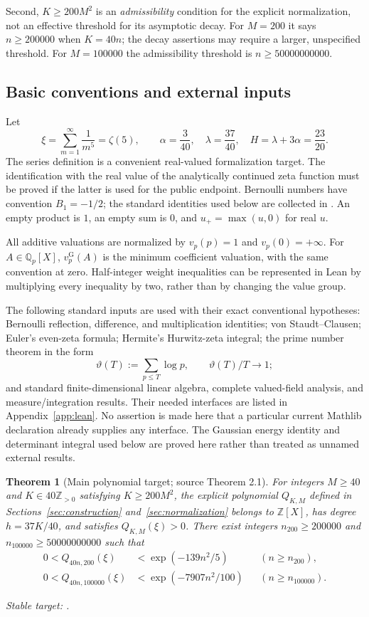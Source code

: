 \documentclass[11pt]{article}
\newtheorem{theorem}{Theorem}[section]
\theoremstyle{definition}
\theoremstyle{remark}\newtheorem{remark}[theorem]{Remark}
\newcommand{\Z}{\mathbb Z}\newcommand{\Q}{\mathbb Q}
\newcommand{\Qp}{\mathbb Q_p}\newcommand{\Zp}{\mathbb Z_p}
\newcommand{\gid}[1]{\par\noindent\textit{Stable target: }\path{#1}.\par\smallskip}
\numberwithin{equation}{section}
\begin{document}
Second, $K\ge200M^2$ is an \emph{admissibility} condition for the explicit
normalization, not an effective threshold for its asymptotic decay. For
$M=200$ it says $n\ge200000$ when $K=40n$; the decay assertions may require
a larger, unspecified threshold. For $M=100000$ the admissibility threshold
is $n\ge50000000000$.

\subsection{Basic conventions and external inputs}
Let
\[
 \xi=\sum_{m=1}^{\infty}\frac1{m^5}=\zeta(5),\qquad
 \alpha=\frac3{40},\quad \lambda=\frac{37}{40},\quad
 H=\lambda+3\alpha=\frac{23}{20}.
\]
The series definition is a convenient real-valued formalization target.
The identification with the real value of the analytically continued zeta
function must be proved if the latter is used for the public endpoint.
Bernoulli numbers have convention $B_1=-1/2$; the standard identities used below are collected in \cite{DLMF}. An empty product is $1$, an
empty sum is $0$, and $u_+=\max(u,0)$ for real $u$.

All additive valuations are normalized by $v_p(p)=1$ and $v_p(0)=+\infty$.
For $A\in\Qp[X]$, $v_p^{\mathrm G}(A)$ is the minimum coefficient
valuation, with the same convention at zero. Half-integer weight
inequalities can be represented in Lean by multiplying every inequality
by two, rather than by changing the value group.

The following standard inputs are used with their exact conventional
hypotheses: Bernoulli reflection, difference, and multiplication identities;
von Staudt--Clausen; Euler's even-zeta formula; Hermite's Hurwitz-zeta
integral; the prime number theorem in the form
\begin{equation}\label{eq:pnt}
 \vartheta(T):=\sum_{p\le T}\log p,\qquad \vartheta(T)/T\longrightarrow1;
\end{equation}
and standard finite-dimensional linear algebra, complete valued-field
analysis, and measure/integration results. Their needed interfaces are
listed in Appendix~\ref{app:lean}. No assertion is made here that a
particular current Mathlib declaration already supplies any interface.
The Gaussian energy identity and determinant integral used below are
proved here rather than treated as unnamed external results.

\begin{theorem}[Main polynomial target; source Theorem 2.1]
\label{thm:polynomialtarget}
For integers $M\ge40$ and $K\in40\Z_{>0}$ satisfying $K\ge200M^2$, the
explicit polynomial $Q_{K,M}$ defined in Sections~\ref{sec:construction}
and~\ref{sec:normalization} belongs to $\Z[X]$, has degree
$h=37K/40$, and satisfies $Q_{K,M}(\xi)>0$. There exist integers
$n_{200}\ge200000$ and $n_{100000}\ge50000000000$ such that
\begin{align}
 0<Q_{40n,200}(\xi)&<\exp(-139n^2/5) &&(n\ge n_{200}),\label{eq:decay200}\\
 0<Q_{40n,100000}(\xi)&<\exp(-7907n^2/100)
 &&(n\ge n_{100000}).\label{eq:decaylarge}
\end{align}
\gid{Zeta5.polynomial_estimates}
\end{theorem}
\end{document}
